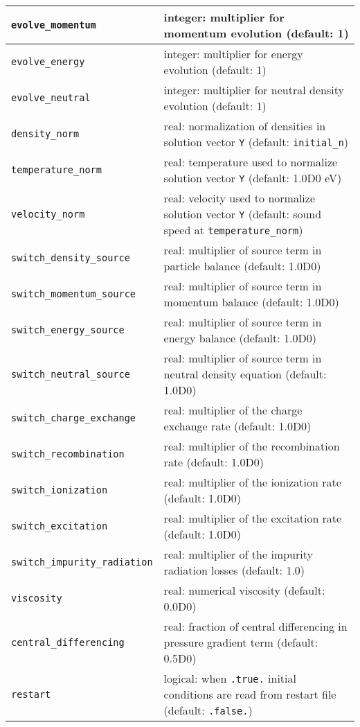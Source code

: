 \documentclass[amsmath,amssymb,a4]{revtex4-2}
\begin{document}
\begin{table}[h]
\begin{center}
\begin{tabular}{|| l  | l ||}
	{\tt evolve\_momentum}       & integer: multiplier for momentum evolution (default: 1) \\ \hline
	{\tt evolve\_energy}         & integer: multiplier for energy evolution (default: 1) \\ \hline
	{\tt evolve\_neutral}        & integer: multiplier for neutral density evolution (default: 1) \\ \hline
	{\tt density\_norm}          & real: normalization of densities in solution vector {\tt Y} (default: {\tt initial\_n}) \\ \hline
	{\tt temperature\_norm}      & real: temperature used to normalize solution vector {\tt Y} (default: 1.0D0 eV) \\ \hline
	{\tt velocity\_norm}         & real: velocity used to normalize solution vector {\tt Y} (default: sound speed at {\tt temperature\_norm}) \\ \hline
	{\tt switch\_density\_source} & real: multiplier of source term in particle balance (default: 1.0D0) \\ \hline
	{\tt switch\_momentum\_source}& real: multiplier of source term in momentum balance (default: 1.0D0) \\ \hline
	{\tt switch\_energy\_source}  & real: multiplier of source term in energy balance (default: 1.0D0) \\ \hline
	{\tt switch\_neutral\_source} & real: multiplier of source term in neutral density equation (default: 1.0D0) \\ \hline
	{\tt switch\_charge\_exchange}& real: multiplier of the charge exchange rate (default: 1.0D0) \\ \hline
	{\tt switch\_recombination}  & real: multiplier of the recombination rate (default: 1.0D0) \\ \hline
	{\tt switch\_ionization}     & real: multiplier of the ionization rate (default: 1.0D0) \\ \hline
	{\tt switch\_excitation}     & real: multiplier of the excitation rate (default: 1.0D0) \\ \hline
	{\tt switch\_impurity\_radiation}& real: multiplier of the impurity radiation losses (default: 1.0) \\ \hline
	{\tt viscosity}              & real: numerical viscosity (default: 0.0D0)  \\ \hline
	{\tt central\_differencing}   & real: fraction of central differencing in pressure gradient term (default: 0.5D0) \\ \hline
	{\tt restart}                & logical: when {\tt .true.} initial conditions are read from restart file (default: {\tt .false.}) \\ \hline
    \hline
  \end{tabular}
\end{center}
\end{table}
\end{document}
